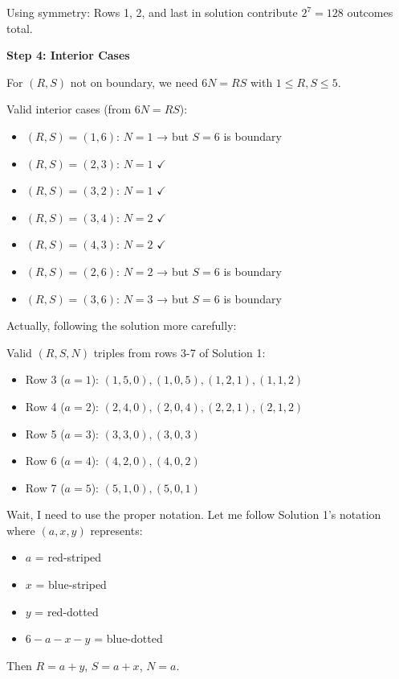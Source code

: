 \documentclass[12pt]{article}
\begin{document}
\begin{solutionbox}
Using symmetry: Rows 1, 2, and last in solution contribute $2^7 = 128$ outcomes total.

\textbf{Step 4: Interior Cases}

For $(R, S)$ not on boundary, we need $6N = RS$ with $1 \leq R, S \leq 5$.

Valid interior cases (from $6N = RS$):

\begin{itemize}
    \item $(R, S) = (1, 6)$: $N = 1$ → but $S = 6$ is boundary
    \item $(R, S) = (2, 3)$: $N = 1$ $\checkmark$
    \item $(R, S) = (3, 2)$: $N = 1$ $\checkmark$
    \item $(R, S) = (3, 4)$: $N = 2$ $\checkmark$
    \item $(R, S) = (4, 3)$: $N = 2$ $\checkmark$
    \item $(R, S) = (2, 6)$: $N = 2$ → but $S = 6$ is boundary
    \item $(R, S) = (3, 6)$: $N = 3$ → but $S = 6$ is boundary
\end{itemize}

Actually, following the solution more carefully:

Valid $(R, S, N)$ triples from rows 3-7 of Solution 1:
\begin{itemize}
    \item Row 3 ($a=1$): $(1, 5, 0), (1, 0, 5), (1, 2, 1), (1, 1, 2)$
    \item Row 4 ($a=2$): $(2, 4, 0), (2, 0, 4), (2, 2, 1), (2, 1, 2)$
    \item Row 5 ($a=3$): $(3, 3, 0), (3, 0, 3)$
    \item Row 6 ($a=4$): $(4, 2, 0), (4, 0, 2)$
    \item Row 7 ($a=5$): $(5, 1, 0), (5, 0, 1)$
\end{itemize}

Wait, I need to use the proper notation. Let me follow Solution 1's notation where $(a, x, y)$ represents:
\begin{itemize}
    \item $a$ = red-striped
    \item $x$ = blue-striped
    \item $y$ = red-dotted
    \item $6-a-x-y$ = blue-dotted
\end{itemize}

Then $R = a + y$, $S = a + x$, $N = a$.


\end{solutionbox}
\end{document}
